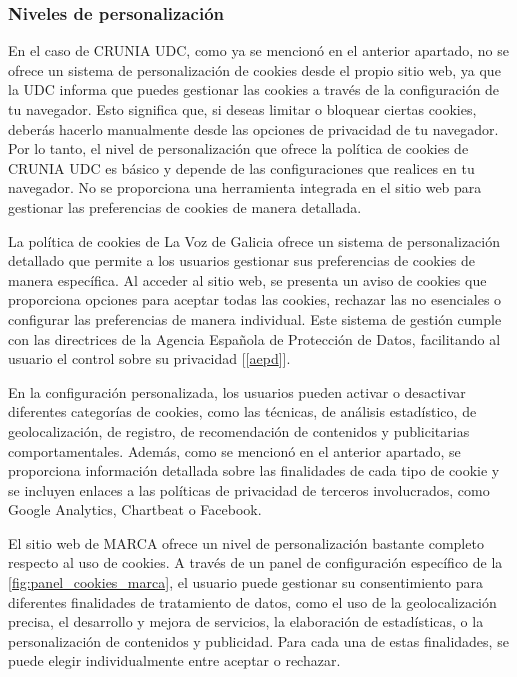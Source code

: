 \subsubsection{Niveles de personalización}

En el caso de CRUNIA UDC, como ya se mencionó en el anterior apartado, no se ofrece un sistema de personalización de cookies desde el propio sitio web, ya que la UDC informa que puedes gestionar las cookies a través de la configuración de tu navegador. Esto significa que, si deseas limitar o bloquear ciertas cookies, deberás hacerlo manualmente desde las opciones de privacidad de tu navegador. Por lo tanto, el nivel de personalización que ofrece la política de cookies de CRUNIA UDC es básico y depende de las configuraciones que realices en tu navegador. No se proporciona una herramienta integrada en el sitio web para gestionar las preferencias de cookies de manera detallada. 

 
La política de cookies de La Voz de Galicia ofrece un sistema de personalización detallado que permite a los usuarios gestionar sus preferencias de cookies de manera específica. Al acceder al sitio web, se presenta un aviso de cookies que proporciona opciones para aceptar todas las cookies, rechazar las no esenciales o configurar las preferencias de manera individual. Este sistema de gestión cumple con las directrices de la Agencia Española de Protección de Datos, facilitando al usuario el control sobre su privacidad [[\url{aepd}]]. 

En la configuración personalizada, los usuarios pueden activar o desactivar diferentes categorías de cookies, como las técnicas, de análisis estadístico, de geolocalización, de registro, de recomendación de contenidos y publicitarias comportamentales. Además, como se mencionó en el anterior apartado, se proporciona información detallada sobre las finalidades de cada tipo de cookie y se incluyen enlaces a las políticas de privacidad de terceros involucrados, como Google Analytics, Chartbeat o Facebook. 


El sitio web de MARCA ofrece un nivel de personalización bastante completo respecto al uso de cookies. A través de un panel de configuración específico de la \ref{fig:panel_cookies_marca}, el usuario puede gestionar su consentimiento para diferentes finalidades de tratamiento de datos, como el uso de la geolocalización precisa, el desarrollo y mejora de servicios, la elaboración de estadísticas, o la personalización de contenidos y publicidad. Para cada una de estas finalidades, se puede elegir individualmente entre aceptar o rechazar. 

